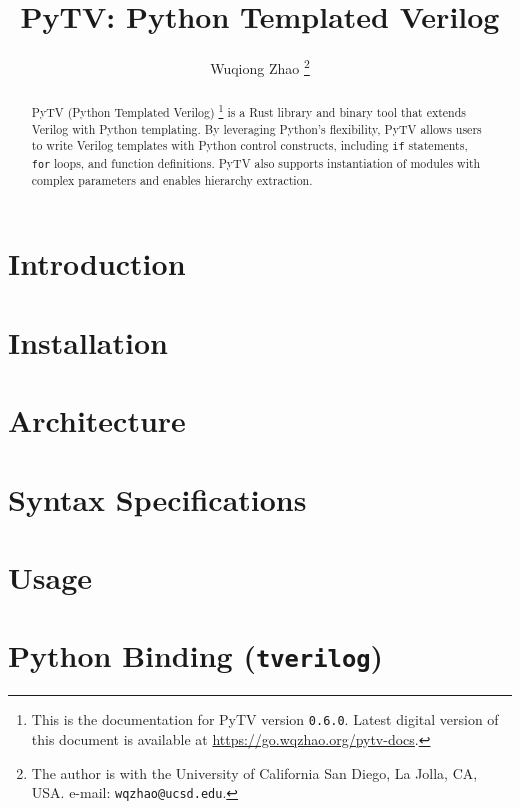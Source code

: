 \documentclass{article}
\title{PyTV: Python Templated Verilog}
\author{Wuqiong Zhao%
  \thanks{The author is with the University of California San Diego, La Jolla, CA, USA.
  e-mail: \texttt{wqzhao@ucsd.edu}.}}
\newcommand{\pytvversion}{0.6.0}
\begin{document}
\maketitle

\begin{abstract}
  PyTV (Python Templated Verilog)%
  \footnote{This is the documentation for PyTV version \texttt{\pytvversion{}}.
  Latest digital version of this document is available at \url{https://go.wqzhao.org/pytv-docs}.}
  is a Rust library and binary tool that extends Verilog with Python templating.
  By leveraging Python's flexibility,
  PyTV allows users to write Verilog templates with Python control constructs,
  including \texttt{if} statements, \texttt{for} loops, and function definitions.
  PyTV also supports instantiation of modules with complex parameters
  and enables hierarchy extraction.
\end{abstract}

\tableofcontents

\section{Introduction}\label{sec:introduction}


\section{Installation}\label{sec:installation}


\section{Architecture}\label{sec:architecture}


\section{Syntax Specifications}\label{sec:syntax}


\section{Usage}\label{sec:usage}


\section{Python Binding (\texttt{tverilog})}\label{sec:tverilog}

\end{document}
